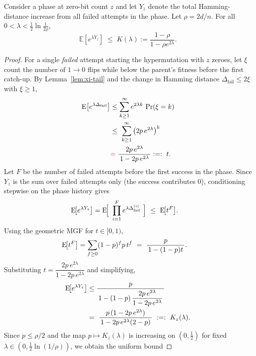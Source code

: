 \begin{lemma}%
	\label{lem:phase-mgf}
	Consider a phase at zero-bit count $z$ and let $Y_z$ denote the total 
	Hamming-distance increase from all failed attempts in the phase.  
	Let $\rho = 2d/n$.  
	For all $0<\lambda<\tfrac12\ln\frac{1}{2\rho}$,
	\[
	\mathbb{E}[e^{\lambda Y_z}] 
	\;\le\; 
	K(\lambda)
	:= 
	\frac{1-\rho}{1-\rho e^{2\lambda}}.
	\]
\end{lemma}

\begin{proof}
	For a single \emph{failed} attempt starting the hypermutation with $z$ zeroes, let $\xi$ count the number of $1\!\to 0$ flips while below the parent's fitness before the first catch-up.
	By Lemma~\ref{lem:xi-tail} and the change in Hamming distance $\Delta_{\mathrm{fail}}\le 2\xi$ with $\xi\ge 1$,
	\begin{align*}
		\EE\!\left[e^{\lambda \Delta_{\mathrm{fail}}}\right]
		&\le \sum_{k\ge 1}^{\infty} e^{2\lambda k}\,\Pr(\xi=k)
		\\ &\le\ \sum_{k\ge 1}^{\infty} \big(2p\,e^{2\lambda}\big)^{k}
		\\ &\textcolor{purple}{=}\ \frac{2p\,e^{2\lambda}}{\,1-2p\,e^{2\lambda}\,}:=:\ t.
	\end{align*}
	Let $F$ be the number of failed attempts before the first success in the phase. %
	Since $Y_z$ is the sum over failed attempts only (the success contributes $0$), conditioning stepwise on the phase history gives
	\begin{align*}
		\text{E}\!\big[e^{\lambda Y_z}\big]
		&=\text{E}\!\Big[\ \prod_{i=1}^{F} e^{\lambda \Delta_{\mathrm{fail}}^{(i)}}\ \Big]
		\ \le\ \text{E}\!\big[t^{F}\big].
	\end{align*}
	Using the geometric MGF for $t\in[0,1)$,
	\begin{align*}
		\text{E}\!\big[t^{F}\big]
		&=
		 \sum_{f\ge 0} (1-p)^f p\, t^f
		\ =\ \frac{p}{\,1-(1-p)t\,}.
	\end{align*}
	Substituting $t=\dfrac{2p\,e^{2\lambda}}{1-2p\,e^{2\lambda}}$ and simplifying,
	\begin{align*}
		\EE\!\big[e^{\lambda Y_z}\big]
		&\le \frac{p}{\,1-(1-p)\,\dfrac{2p\,e^{2\lambda}}{1-2p\,e^{2\lambda}}\,}
		\\ &=\ \frac{p\,(1-2p\,e^{2\lambda})}{\,1-2p\,e^{2\lambda}(2-p)\,}
		\ :=:\ K_z(\lambda).
	\end{align*}
	Since $p\le \rho/2$ and the map $p\mapsto K_z(\lambda)$ is increasing on $(0,\tfrac12)$ for fixed $\lambda\in(0,\tfrac12\ln(1/\rho))$, we obtain the uniform bound

\end{proof}
